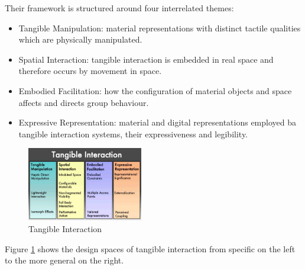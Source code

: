 Their framework is structured around four interrelated themes:
\begin{itemize}
\item Tangible Manipulation:  material representations with distinct tactile qualities which are physically manipulated.
\item Spatial Interaction: tangible interaction is embedded in real space and therefore occurs by movement in space.
\item Embodied Facilitation: how the configuration of material objects and space affects and directs group behaviour.
\item Expressive Representation: material and digital representations employed ba tangible interaction systems, their expressiveness and legibility.
\end{itemize}

\begin{figure}
\centering
\includegraphics[width=0.45\textwidth]{figures/tangibleInteraction.png}
\caption{Tangible Interaction}
\label{fig:tangibleInteraction}
\end{figure}

Figure \ref{fig:tangibleInteraction} shows the design spaces of tangible interaction from specific on the left to the more general on the right. 

